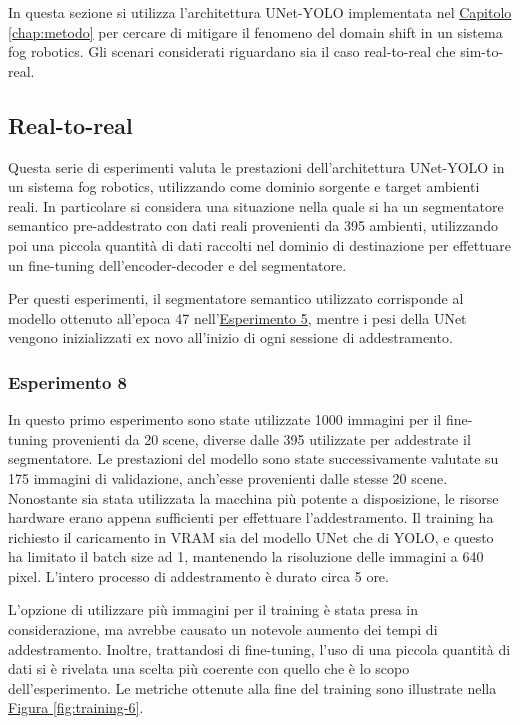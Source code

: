 \documentclass[12pt]{report}
\begin{document}
In questa sezione si utilizza l'architettura UNet-YOLO implementata nel \hyperref[chap:metodo]{Capitolo \ref{chap:metodo}} per cercare di mitigare il fenomeno del domain shift in un sistema fog robotics. Gli scenari considerati riguardano sia il caso real-to-real che sim-to-real.

\subsection{Real-to-real}
\label{sec:real_to_real_fr}

Questa serie di esperimenti valuta le prestazioni dell'architettura UNet-YOLO in un sistema fog robotics, utilizzando come dominio sorgente e target ambienti reali. In particolare si considera una situazione nella quale si ha un segmentatore semantico pre-addestrato con dati reali provenienti da 395 ambienti, utilizzando poi una piccola quantità di dati raccolti nel dominio di destinazione per effettuare un fine-tuning dell'encoder-decoder e del segmentatore.

Per questi esperimenti, il segmentatore semantico utilizzato corrisponde al modello ottenuto all’epoca 47 nell'\hyperref[sec:esperimento_5]{Esperimento 5}, mentre i pesi della UNet vengono inizializzati ex novo all'inizio di ogni sessione di addestramento.

\subsubsection{Esperimento 8}
\label{sec:esperimento_8}

In questo primo esperimento sono state utilizzate 1000 immagini per il fine-tuning provenienti da 20 scene, diverse dalle 395 utilizzate per addestrate il segmentatore. Le prestazioni del modello sono state successivamente valutate su 175 immagini di validazione, anch'esse provenienti dalle stesse 20 scene. Nonostante sia stata utilizzata la macchina più potente a disposizione, le risorse hardware erano appena sufficienti per effettuare l'addestramento. Il training ha richiesto il caricamento in VRAM sia del modello UNet che di YOLO, e questo ha limitato il batch size ad 1, mantenendo la risoluzione delle immagini a 640 pixel. L'intero processo di addestramento è durato circa 5 ore.

L'opzione di utilizzare più immagini per il training è stata presa in considerazione, ma avrebbe causato un notevole aumento dei tempi di addestramento. Inoltre, trattandosi di fine-tuning, l'uso di una piccola quantità di dati si è rivelata una scelta più coerente con quello che è lo scopo dell'esperimento. Le metriche ottenute alla fine del training sono illustrate nella \hyperref[fig:training-6]{Figura \ref{fig:training-6}}.
\end{document}
